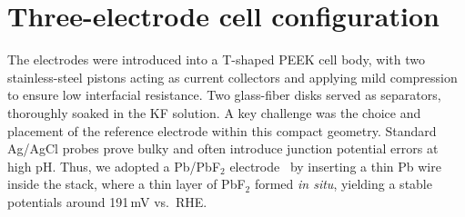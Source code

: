 \section{Three-electrode cell configuration}




The electrodes were introduced into a T-shaped PEEK cell body, with two stainless-steel pistons acting as current collectors and applying mild compression to ensure low interfacial resistance. Two glass-fiber disks served as separators, thoroughly soaked in the KF solution. A key challenge was the choice and placement of the reference electrode within this compact geometry. Standard Ag/AgCl probes prove bulky and often introduce junction potential errors at high pH. Thus, we adopted a Pb/PbF$_2$ electrode~\cite{Pasta2012,Pianta2023} by inserting a thin Pb wire inside the stack, where a thin layer of PbF$_2$ formed \textit{in situ}, yielding a stable potentials around 191\,mV vs.\ RHE.



